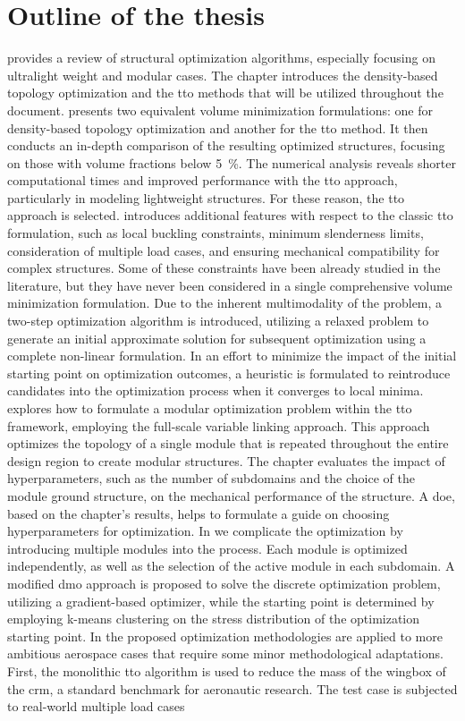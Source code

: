 \section*{Outline of the thesis}
 provides a review of structural optimization algorithms, especially focusing on ultralight weight and modular cases. The chapter introduces the density-based topology optimization and the \gls{tto} methods that will be utilized throughout the document.  presents two equivalent volume minimization formulations: one for density-based topology optimization and another for the \gls{tto} method. It then conducts an in-depth comparison of the resulting optimized structures, focusing on those with volume fractions below \qty{5}{\percent}. The numerical analysis reveals shorter computational times and improved performance with the \gls{tto} approach, particularly in modeling lightweight structures. For these reason, the \gls{tto} approach is selected.  introduces additional features with respect to the classic \gls{tto} formulation, such as local buckling constraints, minimum slenderness limits, consideration of multiple load cases, and ensuring mechanical compatibility for complex structures. Some of these constraints have been already studied in the literature, but they have never been considered in a single comprehensive volume minimization formulation. Due to the inherent multimodality of the problem, a two-step optimization algorithm is introduced, utilizing a relaxed problem to generate an initial approximate solution for subsequent optimization using a complete non-linear formulation. In an effort to minimize the impact of the initial starting point on optimization outcomes, a heuristic is formulated to reintroduce candidates into the optimization process when it converges to local minima.  explores how to formulate a modular optimization problem within the \gls{tto} framework, employing the full-scale variable linking approach. This approach optimizes the topology of a single module that is repeated throughout the entire design region to create modular structures. The chapter evaluates the impact of hyperparameters, such as the number of subdomains and the choice of the module ground structure, on the mechanical performance of the structure. A \gls{doe}, based on the chapter's results, helps to formulate a guide on choosing hyperparameters for optimization. In  we complicate the optimization by introducing multiple modules into the process. Each module is optimized independently, as well as the selection of the active module in each subdomain. A modified \gls{dmo} approach is proposed to solve the discrete optimization problem, utilizing a gradient-based optimizer, while the starting point is determined by employing k-means clustering on the stress distribution of the optimization starting point. In  the proposed optimization methodologies are applied to more ambitious aerospace cases that require some minor methodological adaptations. First, the monolithic \gls{tto} algorithm is used to reduce the mass of the wingbox of the \gls{crm}, a standard benchmark for aeronautic research. The test case is subjected to real-world multiple load cases 